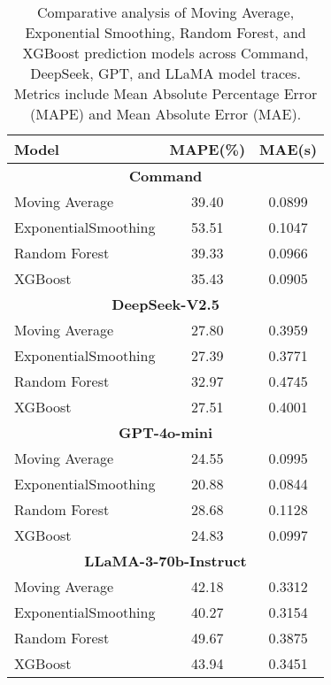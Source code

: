 \begin{table}[t]
    \centering
    \footnotesize
    \begin{tabular}{p{3.5cm}cc}
    \toprule
    \textbf{Model} & \textbf{MAPE(\%)} & \textbf{MAE(s)} \\
    \midrule
    \multicolumn{3}{c}{\textbf{Command}} \\
    \midrule
    Moving Average & 39.40 & 0.0899 \\
    ExponentialSmoothing & 53.51 & 0.1047 \\
    Random Forest & 39.33 & 0.0966 \\
    XGBoost & 35.43 & 0.0905 \\
    \midrule
    \multicolumn{3}{c}{\textbf{DeepSeek-V2.5}} \\
    \midrule
    Moving Average & 27.80 & 0.3959 \\
    ExponentialSmoothing & 27.39 & 0.3771 \\
    Random Forest & 32.97 & 0.4745 \\
    XGBoost & 27.51 & 0.4001 \\
    \midrule
    \multicolumn{3}{c}{\textbf{GPT-4o-mini}} \\
    \midrule
    Moving Average & 24.55 & 0.0995 \\
    ExponentialSmoothing & 20.88 & 0.0844 \\
    Random Forest & 28.68 & 0.1128 \\
    XGBoost & 24.83 & 0.0997 \\
    \midrule
    \multicolumn{3}{c}{\textbf{LLaMA-3-70b-Instruct}} \\
    \midrule
    Moving Average & 42.18 & 0.3312 \\
    ExponentialSmoothing & 40.27 & 0.3154 \\
    Random Forest & 49.67 & 0.3875 \\
    XGBoost & 43.94 & 0.3451 \\
    \bottomrule
    \end{tabular}
    \caption{Comparative analysis of Moving Average, Exponential Smoothing, Random Forest, and XGBoost prediction models across Command, DeepSeek, GPT, and LLaMA model traces. Metrics include Mean Absolute Percentage Error (MAPE) and Mean Absolute Error (MAE).}
    \label{tab:model-comparison}
\end{table}